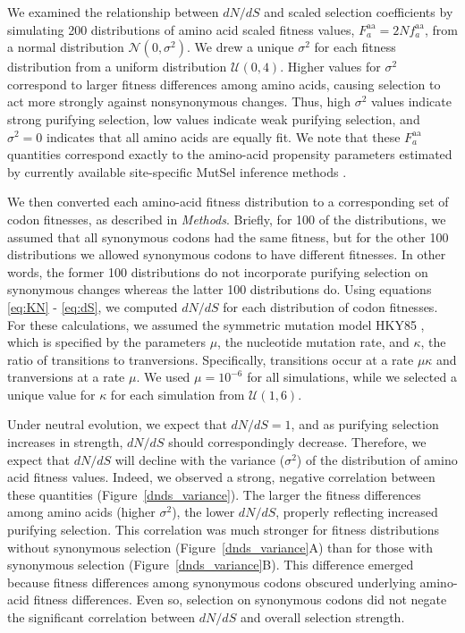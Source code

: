 \documentclass[11pt]{article}
\begin{document}
We examined the relationship between $dN/dS$ and scaled selection coefficients by simulating 200 distributions of amino acid scaled fitness values, $F^\text{aa}_a = 2Nf^\text{aa}_a$, from a normal distribution $\mathcal{N}(0,\sigma^2)$. We drew a unique $\sigma^2$ for each fitness distribution from a uniform distribution $\mathcal{U}(0,4)$. Higher values for $\sigma^2$ correspond to larger fitness differences among amino acids, causing selection to act more strongly against nonsynonymous changes. Thus, high $\sigma^2$ values indicate strong purifying selection, low values indicate weak purifying selection, and $\sigma^2 = 0$ indicates that all amino acids are equally fit. We note that these $F^\text{aa}_a$ quantities correspond exactly to the amino-acid propensity parameters estimated by currently available site-specific MutSel inference methods \citep{RodrigueLartillot2014,Tamurietal2014}.

We then converted each amino-acid fitness distribution to a corresponding set of codon fitnesses, as described in \emph{Methods}. Briefly, for 100 of the distributions, we assumed that all synonymous codons had the same fitness, but for the other 100 distributions we allowed synonymous codons to have different fitnesses. In other words, the former 100 distributions do not incorporate purifying selection on synonymous changes whereas the latter 100 distributions do. Using equations \eqref{eq:KN} - \eqref{eq:dS}, we computed $dN/dS$ for each distribution of codon fitnesses. For these calculations, we assumed the symmetric mutation model HKY85 \citep{HKY85}, which is specified by the parameters $\mu$, the nucleotide mutation rate, and $\kappa$, the ratio of transitions to tranversions. Specifically, transitions occur at a rate $\mu\kappa$ and tranversions at a rate $\mu$. We used $\mu = 10^{-6}$ for all simulations, while we selected a unique value for $\kappa$ for each simulation from $\mathcal{U}(1,6)$.

Under neutral evolution, we expect that $dN/dS = 1$, and as purifying selection increases in strength, $dN/dS$ should correspondingly decrease. Therefore, we expect that $dN/dS$ will decline with the variance ($\sigma^2$) of the distribution of amino acid fitness values. Indeed, we observed a strong, negative correlation between these quantities (Figure~\ref{dnds_variance}). The larger the fitness differences among amino acids (higher $\sigma^2$), the lower $dN/dS$, properly reflecting increased purifying selection. This correlation was much stronger for fitness distributions without synonymous selection (Figure~\ref{dnds_variance}A) than for those with synonymous selection (Figure~\ref{dnds_variance}B). This difference emerged because fitness differences among synonymous codons obscured underlying amino-acid fitness differences. Even so, selection on synonymous codons did not negate the significant correlation between $dN/dS$ and overall selection strength.
\end{document}

